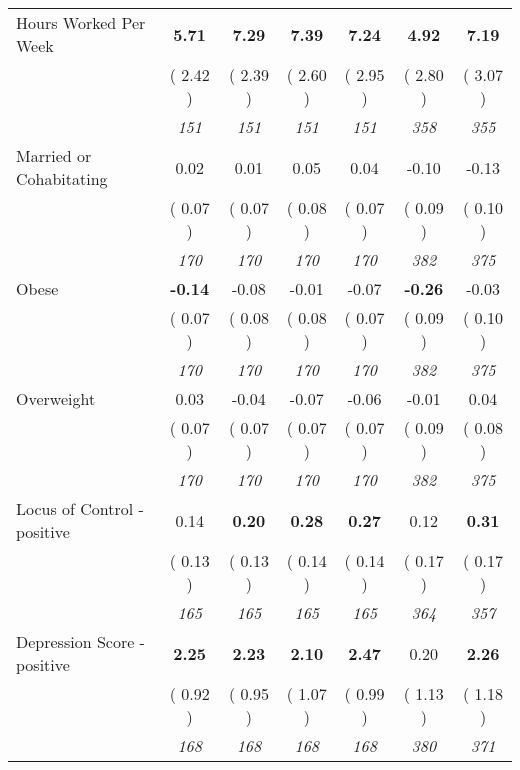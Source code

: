 \begin{tabular}{l c c c c c c}
Hours Worked Per Week & \textbf{      5.71 } & \textbf{      7.29 } & \textbf{      7.39 } & \textbf{     7.24} & \textbf{      4.92 } & \textbf{      7.19 } \\
& (     2.42 ) & (     2.39 ) & (     2.60 ) & (     2.95 ) & (     2.80 ) & (     3.07 ) \\
& \textit{ 151 } & \textit{ 151 } & \textit{ 151 } & \textit{ 151 } & \textit{ 358 } & \textit{ 355 } \\
Married or Cohabitating &      0.02 &      0.01 &      0.05 &      0.04 &     -0.10 &     -0.13 \\
& (     0.07 ) & (     0.07 ) & (     0.08 ) & (     0.07 ) & (     0.09 ) & (     0.10 ) \\
& \textit{ 170 } & \textit{ 170 } & \textit{ 170 } & \textit{ 170 } & \textit{ 382 } & \textit{ 375 } \\
Obese & \textbf{     -0.14 } &     -0.08 &     -0.01 &     -0.07 & \textbf{     -0.26 } &     -0.03 \\
& (     0.07 ) & (     0.08 ) & (     0.08 ) & (     0.07 ) & (     0.09 ) & (     0.10 ) \\
& \textit{ 170 } & \textit{ 170 } & \textit{ 170 } & \textit{ 170 } & \textit{ 382 } & \textit{ 375 } \\
Overweight &      0.03 &     -0.04 &     -0.07 &     -0.06 &     -0.01 &      0.04 \\
& (     0.07 ) & (     0.07 ) & (     0.07 ) & (     0.07 ) & (     0.09 ) & (     0.08 ) \\
& \textit{ 170 } & \textit{ 170 } & \textit{ 170 } & \textit{ 170 } & \textit{ 382 } & \textit{ 375 } \\
Locus of Control - positive &      0.14 & \textbf{      0.20 } & \textbf{      0.28 } & \textbf{     0.27} &      0.12 & \textbf{      0.31 } \\
& (     0.13 ) & (     0.13 ) & (     0.14 ) & (     0.14 ) & (     0.17 ) & (     0.17 ) \\
& \textit{ 165 } & \textit{ 165 } & \textit{ 165 } & \textit{ 165 } & \textit{ 364 } & \textit{ 357 } \\
Depression Score - positive & \textbf{      2.25 } & \textbf{      2.23 } & \textbf{      2.10 } & \textbf{     2.47} &      0.20 & \textbf{      2.26 } \\
& (     0.92 ) & (     0.95 ) & (     1.07 ) & (     0.99 ) & (     1.13 ) & (     1.18 ) \\
& \textit{ 168 } & \textit{ 168 } & \textit{ 168 } & \textit{ 168 } & \textit{ 380 } & \textit{ 371 } \\

\end{tabular}
